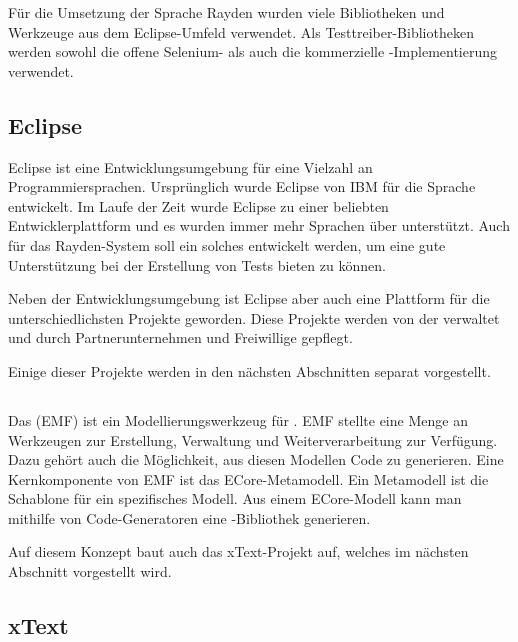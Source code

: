 \SuperPar
Für die Umsetzung der Sprache Rayden wurden viele Bibliotheken und Werkzeuge aus dem Eclipse-Umfeld verwendet. Als Testtreiber-Bibliotheken werden sowohl die offene Selenium- als auch die kommerzielle -Implementierung verwendet.

\subsection{Eclipse}

Eclipse \cite{Eclipse} ist eine Entwicklungsumgebung für eine Vielzahl an Programmiersprachen. Ursprünglich wurde Eclipse von IBM für die Sprache  entwickelt. Im Laufe der Zeit wurde Eclipse zu einer beliebten Entwicklerplattform und es wurden immer mehr Sprachen über  unterstützt. Auch für das Rayden-System soll ein solches  entwickelt werden, um eine gute Unterstützung bei der Erstellung von Tests bieten zu können. 

\SuperPar
Neben der Entwicklungsumgebung ist Eclipse aber auch eine Plattform für die unterschiedlichsten Projekte geworden. Diese Projekte werden von der  \cite{EclipseFoundation} verwaltet und durch Partnerunternehmen und Freiwillige gepflegt. 

\SuperPar
Einige dieser Projekte werden in den nächsten Abschnitten separat vorgestellt.

\subsection{}

Das  (EMF) \cite{EMF} ist ein Modellierungswerkzeug für . EMF stellte eine Menge an Werkzeugen zur Erstellung, Verwaltung und Weiterverarbeitung zur Verfügung. Dazu gehört auch die Möglichkeit, aus diesen Modellen Code zu generieren. Eine Kernkomponente von EMF ist das ECore-Metamodell. Ein Metamodell ist die Schablone für ein spezifisches Modell. Aus einem ECore-Modell kann man mithilfe von Code-Generatoren eine -Bibliothek generieren.

\SuperPar
Auf diesem Konzept baut auch das xText-Projekt auf, welches im nächsten Abschnitt vorgestellt wird. 

\subsection{xText}

